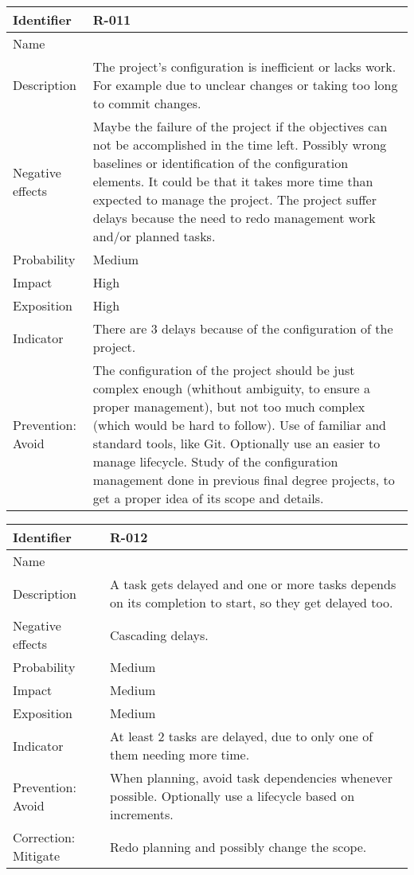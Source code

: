 \begin{table}[H]
	\begin{tabularx}{\textwidth}{|y|z|}
		\hline
		Identifier & \textbf{R-011} \\ \hline
		Name & \Ronce \\ \hline
		Description &
			The project's configuration is inefficient or lacks work. \linej
			For example due to unclear changes or taking too long to commit changes.
		\\ \hline
		Negative effects &
			Maybe the failure of the project if the objectives can not be accomplished in the time left. \linej
			Possibly wrong baselines or identification of the configuration elements. \linej
			It could be that it takes more time than expected to manage the project. \linej
			The project suffer delays because the need to redo management work and/or planned tasks.
		\\ \hline
		Probability & Medium\\ \hline
		Impact &  High\\ \hline
		Exposition &  High\\ \hline
		Indicator & There are 3 delays because of the configuration of the project.\\ \hline
		Prevention: Avoid &
			The configuration of the project should be just complex enough (whithout ambiguity, to ensure a proper management), but not too much complex (which would be hard to follow). \linej
			Use of familiar and standard tools, like Git. \linej
			Optionally use an easier to manage lifecycle. \linej
			Study of the configuration management done in previous final degree projects, to get a proper idea of its scope and details.
		\\ \hline
	\end{tabularx}
\end{table}

\begin{table}[H]
	\begin{tabularx}{\textwidth}{|y|z|}
		\hline
		Identifier & \textbf{R-012} \\ \hline
		Name & \Rdoce \\ \hline
		Description &
			A task gets delayed and one or more tasks depends on its completion to start, so they get delayed too.
		\\ \hline
		Negative effects &
			Cascading delays.
		\\ \hline
		Probability & Medium\\ \hline
		Impact &  Medium\\ \hline
		Exposition &  Medium\\ \hline
		Indicator & At least 2 tasks are delayed, due to only one of them needing more time.\\ \hline
		Prevention: Avoid &
			When planning, avoid task dependencies whenever possible. \linej
			Optionally use a lifecycle based on increments.
		\\ \hline
		Correction: Mitigate &
			Redo planning and possibly change the scope.
		\\ \hline
	\end{tabularx}
\end{table}

